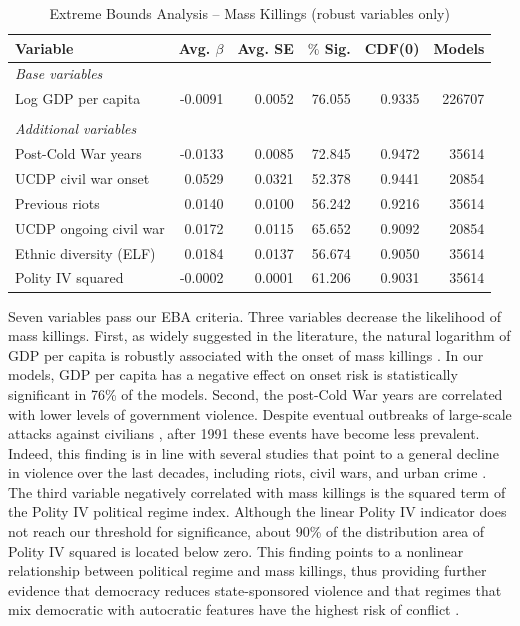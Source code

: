 \begin{table}[H]
\centering
\begin{tabular}{lrrrrr}
\hline
\textbf{Variable} & \textbf{Avg. $\beta$} & \textbf{Avg. SE} & \textbf{$\%$ Sig.} & \textbf{CDF(0)} & \textbf{Models} \\ \hline
\textit{Base variables} &  &  &  &  &  \\
Log GDP per capita & -0.0091 & 0.0052 & 76.055 & 0.9335 & 226707 \\
 &  &  &  &  &  \\
\textit{Additional variables} &  &  &  &  &  \\
Post-Cold War years & -0.0133 & 0.0085 & 72.845 & 0.9472 & 35614 \\
UCDP civil war onset & 0.0529 & 0.0321 & 52.378 & 0.9441 & 20854 \\
Previous riots & 0.0140 & 0.0100 & 56.242 & 0.9216 & 35614 \\
UCDP ongoing civil war & 0.0172 & 0.0115 & 65.652 & 0.9092 & 20854 \\
Ethnic diversity (ELF) & 0.0184 & 0.0137 & 56.674 & 0.9050 & 35614 \\
Polity IV squared & -0.0002 & 0.0001 & 61.206 & 0.9031 & 35614 \\ \hline
\end{tabular}
\caption{Extreme Bounds Analysis -- Mass Killings (robust variables only)}
\label{tab:eba1}
\end{table}

Seven variables pass our EBA criteria. Three variables decrease the likelihood of mass killings. First, as widely suggested in the literature, the natural logarithm of GDP per capita is robustly associated with the onset of mass killings 
\citep[e.g.,][]{besanccon2005relative, easterly2006development,esteban2015strategic}. In our models, GDP per capita has a negative effect on onset risk is statistically significant in 76\% of the models. Second, the post-Cold War years are correlated with lower levels of government violence. Despite eventual outbreaks of large-scale attacks against civilians \citep[e.g.,][]{prunier2005darfur,tatum2010genocide,waldorf2009revisiting}, after 1991 these events have become less prevalent. Indeed, this finding is in line with several studies that point to a general decline in violence over the last decades, including riots, civil wars, and urban crime \citep{eisner2003long,pinker2011better}. The third variable negatively correlated with mass killings is the squared term of the Polity IV political regime index. Although the linear Polity IV indicator does not reach our threshold for significance, about 90\% of the distribution area of Polity IV squared is located below zero. This finding points to a nonlinear relationship between political regime and mass killings, thus providing further evidence that democracy reduces state-sponsored violence \citep{rost2013will,rummel1995democracy} and that regimes that mix democratic with autocratic features have the highest risk of conflict \citep{hegre2001toward,mitchell2013domestic,muchlinski2014grievances,regan2010changing}.

